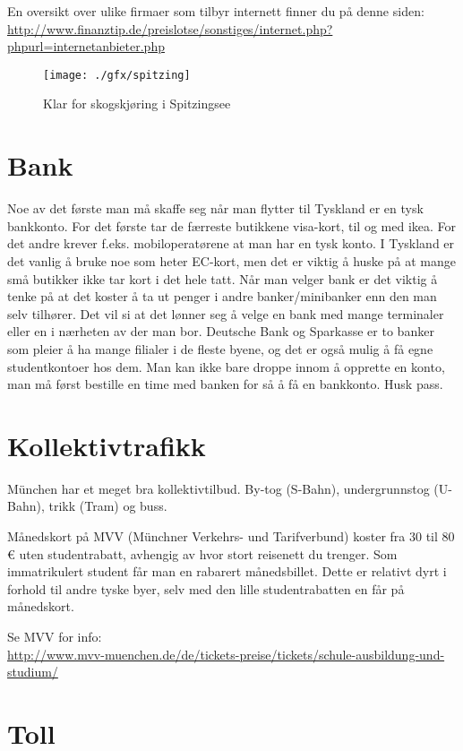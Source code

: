 En oversikt over ulike firmaer som tilbyr internett finner du på denne siden:
\url{http://www.finanztip.de/preislotse/sonstiges/internet.php?phpurl=internetanbieter.php}

\begin{figure}[h]
\center
\texttt{[image: ./gfx/spitzing]}
\caption{Klar for skogskjøring i Spitzingsee}
\end{figure}

\section{Bank}

Noe av det første man må skaffe seg når man flytter til Tyskland er en tysk bankkonto. For det første tar de færreste butikkene visa-kort, til og med ikea. For det andre krever f.eks. mobiloperatørene at man har en tysk konto. I Tyskland er det vanlig å bruke noe som heter EC-kort, men det er viktig å huske på at mange små butikker ikke tar kort i det hele tatt.
Når man velger bank er det viktig å tenke på at det koster å ta ut penger i andre banker/minibanker enn den man selv tilhører. Det vil si at det lønner seg å velge en bank med mange terminaler eller en i nærheten av der man bor. Deutsche Bank og Sparkasse er to banker som pleier å ha mange filialer i de fleste byene, og det er også mulig å få egne studentkontoer hos dem.
Man kan ikke bare droppe innom å opprette en konto, man må først bestille en time med banken for så å få en bankkonto. Husk pass.



\section{Kollektivtrafikk} \label{mvv}

München har et meget bra kollektivtilbud. By-tog (S-Bahn), undergrunnstog (U-Bahn), trikk (Tram) og buss.

Månedskort på MVV (Münchner Verkehrs- und Tarifverbund) koster fra 30 til 80 \euro{} uten studentrabatt, avhengig av hvor stort reisenett du trenger. Som immatrikulert student får man en rabarert månedsbillet.
Dette er relativt dyrt i forhold til andre tyske byer, selv med den lille studentrabatten en får på månedskort.

Se MVV for info:\\
\url{http://www.mvv-muenchen.de/de/tickets-preise/tickets/schule-ausbildung-und-studium/}


\section{Toll}

